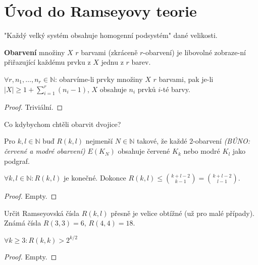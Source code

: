 \chapter{Úvod do Ramseyovy teorie}

"Každý velký systém obsahuje homogenní podsystém" dané velikosti.

\begin{definice}
	\textbf{Obarvení} množiny $X$ $r$ barvami (zkráceně $r$-obarvení) je libovolné zobraze-\newline ní přiřazující každému prvku z $X$ jednu z $r$ barev.
\end{definice}

\begin{veta}
	$\forall r, n_{1}, \dots , n_{r} \in \mathbb{N}$: obarvíme-li prvky množiny $X$ $r$ barvami, pak je-li $|X| \geq 1+ \sum_{i = 1}^{r}(n_{i} - 1)$, $X$ obsahuje $n_{i}$ prvků $i$-té barvy.
\end{veta}

\begin{proof}
	Triviální.
\end{proof}

Co kdybychom chtěli obarvit dvojice?

\begin{definice}
	Pro $k,l \in \mathbb{N}$ buď $R(k,l)$ nejmenší $N \in \mathbb{N}$ takové, že každé $2$-obarvení \textit{(BÚNO: červené a modré obarvení)} $E(K_{N})$ obsahuje červené $K_{k}$ nebo modré $K_{l}$ jako podgraf.
\end{definice}

\begin{veta}
	$\forall k,l \in \mathbb{N}: R(k,l)$ je konečné. Dokonce $R(k,l) \leq \binom{k+l-2}{k-1} = \binom{k+l-2}{l-1}$.
\end{veta}

\begin{proof}
	Empty.
\end{proof}

Určit Ramseyovská čísla $R(k,l)$ přesně je velice obtížné (už pro malé případy). Známá čísla $R(3,3) = 6$, $R(4,4) = 18$.

\begin{veta}
	$\forall k \geq 3: R(k,k) > 2^{k/2}$
\end{veta}

\begin{proof}
	Empty.
\end{proof}

